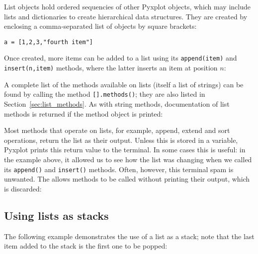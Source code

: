 List objects hold ordered sequencies of other Pyxplot objects, which may
include lists and dictionaries to create hierarchical data structures. They are
created by enclosing a comma-separated list of objects by square brackets:

\begin{verbatim}
a = [1,2,3,"fourth item"]
\end{verbatim}

Once created, more items can be added to a list using its {\tt append(item)}
and {\tt insert(n,item)} methods, where the latter inserts an item at position
$n$:

\vspace{3mm}

\vspace{3mm}

\noindent
A complete list of the methods available on lists (itself a list of strings)
can be found by calling the method {\tt [].methods()}; they are also listed in
Section~\ref{sec:list_methods}. As with string methods, documentation of list
methods is returned if the method object is printed:

\vspace{3mm}

\vspace{3mm}

Most methods that operate on lists, for example, append, extend and sort
operations, return the list as their output. Unless this is stored in a
variable, Pyxplot prints this return value to the terminal. In some cases this
is useful: in the example above, it allowed us to see how the list was changing
when we called its {\tt append()} and {\tt insert()} methods. Often, however,
this terminal spam is unwanted. The  allows methods to be called
without printing their output, which is discarded:

\vspace{3mm}

\vspace{3mm}

\subsection{Using lists as stacks}

The following example demonstrates the use of a list as a stack; note that the
last item added to the stack is the first one to be popped:

\vspace{3mm}

\vspace{3mm}

